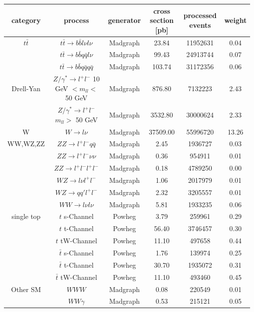 \begin{table}
\scriptsize
\begin{center}
\begin{tabular}{c|c|c|c|c|c}
category & process & generator &  cross section [pb] & processed events & weight\\
\hline 
$t\bar{t}$ & $t\bar{t} \rightarrow b\bar{b}l\nu l\nu$ & Madgraph & 23.84 & 11952631 & 0.04 \\
 & $t\bar{t} \rightarrow b\bar{b}q\bar{q}l\nu$ & Madgraph & 99.43 & 24913744 & 0.07 \\
 & $t\bar{t} \rightarrow b\bar{b}q\bar{q}q\bar{q}$ & Madgraph & 103.74 & 31172356 & 0.06 \\
\hline 
Drell-Yan & $Z/\gamma^{*} \rightarrow l^{+}l^{-}$ 10 GeV $< m_{ll} <$ 50 GeV & Madgraph & 876.80 & 7132223 & 2.43 \\
 & $Z/\gamma^{*} \rightarrow l^{+}l^{-}$ $m_{ll} >$ 50 GeV & Madgraph & 3532.80 & 30000624 & 2.33 \\
\hline 
W & $W \rightarrow l\nu$ & Madgraph & 37509.00 & 55996720 & 13.26 \\
\hline 
WW,WZ,ZZ & $ZZ \rightarrow l^{+}l^{-}q\bar{q}$ & Madgraph & 2.45 & 1936727 & 0.03 \\
 & $ZZ \rightarrow l^{+}l^{-}\nu\nu$ & Madgraph & 0.36 & 954911 & 0.01 \\
 & $ZZ \rightarrow l^{+}l^{-}l^{+}l^{-}$ & Madgraph & 0.18 & 4789250 & 0.00 \\
 & $WZ \rightarrow l\nu l^{+}l^{-}$ & Madgraph & 1.06 & 2017979 & 0.01 \\
 & $WZ \rightarrow qq'l^{+}l^{-}$ & Madgraph & 2.32 & 3205557 & 0.01 \\
 & $WW \rightarrow l\nu l\nu$ & Madgraph & 5.81 & 1933235 & 0.06 \\
\hline 
single top & $t$ s-Channel & Powheg & 3.79 & 259961 & 0.29 \\
 & $t$ t-Channel & Powheg & 56.40 & 3746457 & 0.30 \\
 & $t$ tW-Channel & Powheg & 11.10 & 497658 & 0.44 \\
 & $\bar{t}$ s-Channel & Powheg & 1.76 & 139974 & 0.25 \\
 & $\bar{t}$ t-Channel & Powheg & 30.70 & 1935072 & 0.31 \\
 & $\bar{t}$ tW-Channel & Powheg & 11.10 & 493460 & 0.45 \\
\hline 
Other SM & $WWW$ & Madgraph & 0.08 & 220549 & 0.01 \\
 & $WW\gamma$ & Madgraph & 0.53 & 215121 & 0.05 \\

\end{tabular}
\end{center}
\end{table}
